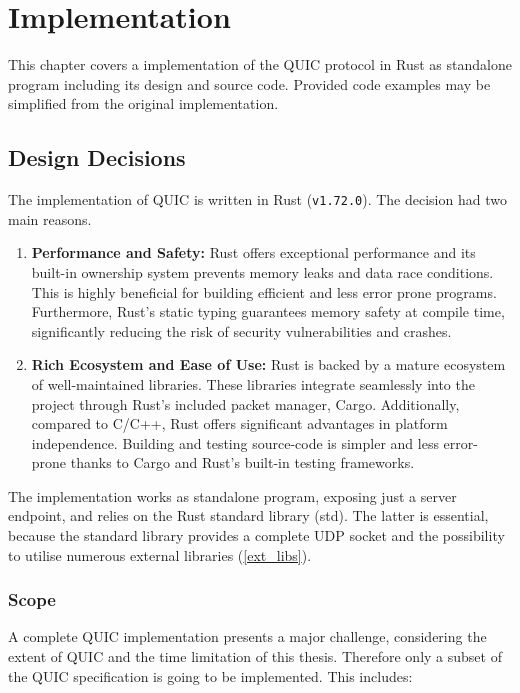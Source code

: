 \chapter{Implementation}

This chapter covers a implementation of the QUIC protocol in Rust as standalone program including its design and source code.
Provided code examples may be simplified from the original implementation. 

\section{Design Decisions}

The implementation of QUIC is written in Rust (\lstinline{v1.72.0}). The decision had two main reasons.
\begingroup
\renewcommand\labelenumi{(\theenumi)}
\begin{enumerate}
\item \textbf{Performance and Safety:} Rust offers exceptional performance and its built-in ownership system prevents memory leaks
and data race conditions. This is highly beneficial for building efficient and less error prone programs. Furthermore, Rust's static
typing guarantees memory safety at compile time, significantly reducing the risk of security vulnerabilities and crashes.
\item \textbf{Rich Ecosystem and Ease of Use:} Rust is backed by a mature ecosystem of well-maintained libraries. These libraries integrate
seamlessly into the project through Rust's included packet manager, Cargo. Additionally, compared to C/C++, Rust offers significant
advantages in platform independence. Building and testing source-code is simpler and less error-prone thanks to Cargo and Rust's
built-in testing frameworks.
\end{enumerate}
\endgroup

The implementation works as standalone program, exposing just a server endpoint, and relies on the Rust standard library (std).
The latter is essential, because the standard library provides a complete UDP socket and the possibility to utilise numerous external
libraries (\ref{ext_libs}).

\subsection{Scope}

A complete QUIC implementation presents a major challenge, considering the extent of QUIC and the time limitation of this thesis.
Therefore only a subset of the QUIC specification is going to be implemented. This includes:


